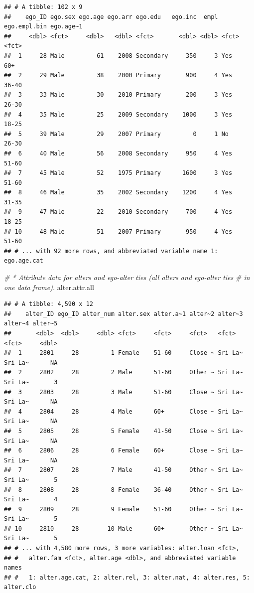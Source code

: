 \documentclass[
]{book}
\newenvironment{Shaded}{\begin{snugshade}}{\end{snugshade}}
\newcommand{\CommentTok}[1]{\textcolor[rgb]{0.56,0.35,0.01}{\textit{#1}}}
\newcommand{\NormalTok}[1]{#1}
\begin{document}
\begin{verbatim}
## # A tibble: 102 x 9
##    ego_ID ego.sex ego.age ego.arr ego.edu   ego.inc  empl ego.empl.bin ego.age~1
##     <dbl> <fct>     <dbl>   <dbl> <fct>       <dbl> <dbl> <fct>        <fct>    
##  1     28 Male         61    2008 Secondary     350     3 Yes          60+      
##  2     29 Male         38    2000 Primary       900     4 Yes          36-40    
##  3     33 Male         30    2010 Primary       200     3 Yes          26-30    
##  4     35 Male         25    2009 Secondary    1000     3 Yes          18-25    
##  5     39 Male         29    2007 Primary         0     1 No           26-30    
##  6     40 Male         56    2008 Secondary     950     4 Yes          51-60    
##  7     45 Male         52    1975 Primary      1600     3 Yes          51-60    
##  8     46 Male         35    2002 Secondary    1200     4 Yes          31-35    
##  9     47 Male         22    2010 Secondary     700     4 Yes          18-25    
## 10     48 Male         51    2007 Primary       950     4 Yes          51-60    
## # ... with 92 more rows, and abbreviated variable name 1: ego.age.cat
\end{verbatim}

\begin{Shaded}
\begin{Highlighting}[]
\CommentTok{\# * Attribute data for alters and ego{-}alter ties (all alters and ego{-}alter ties }
\CommentTok{\# in one data frame). }
\NormalTok{alter.attr.all}
\end{Highlighting}
\end{Shaded}

\begin{verbatim}
## # A tibble: 4,590 x 12
##    alter_ID ego_ID alter_num alter.sex alter.a~1 alter~2 alter~3 alter~4 alter~5
##       <dbl>  <dbl>     <dbl> <fct>     <fct>     <fct>   <fct>   <fct>     <dbl>
##  1     2801     28         1 Female    51-60     Close ~ Sri La~ Sri La~      NA
##  2     2802     28         2 Male      51-60     Other ~ Sri La~ Sri La~       3
##  3     2803     28         3 Male      51-60     Close ~ Sri La~ Sri La~      NA
##  4     2804     28         4 Male      60+       Close ~ Sri La~ Sri La~      NA
##  5     2805     28         5 Female    41-50     Close ~ Sri La~ Sri La~      NA
##  6     2806     28         6 Female    60+       Close ~ Sri La~ Sri La~      NA
##  7     2807     28         7 Male      41-50     Other ~ Sri La~ Sri La~       5
##  8     2808     28         8 Female    36-40     Other ~ Sri La~ Sri La~       4
##  9     2809     28         9 Female    51-60     Other ~ Sri La~ Sri La~       5
## 10     2810     28        10 Male      60+       Other ~ Sri La~ Sri La~       5
## # ... with 4,580 more rows, 3 more variables: alter.loan <fct>,
## #   alter.fam <fct>, alter.age <dbl>, and abbreviated variable names
## #   1: alter.age.cat, 2: alter.rel, 3: alter.nat, 4: alter.res, 5: alter.clo
\end{verbatim}
\end{document}

